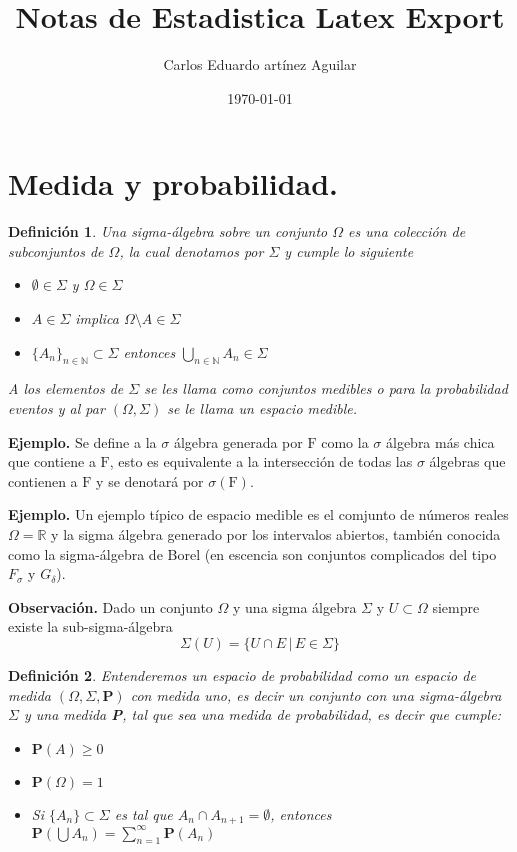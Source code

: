 \documentclass[letterpaper]{article}
\author{Carlos Eduardo artínez Aguilar}
\date{\today}
\title{Notas de Estadistica Latex Export}
\newtheorem{def.}{Definici\'on}[section]
\newcommand{\nat}{\ensuremath{ \mathbb N }}
\newcommand{\eje}{{\newline \noindent \sc \textbf{Ejemplo. }}}
\newcommand{\obs}{{\newline \noindent \sc \textbf{Observación. }}}
\newcommand{\re}{\ensuremath{\mathbb R }}
\begin{document}
\maketitle
\tableofcontents

\section{Medida y probabilidad.}
\label{sec:org2c0d45f}

\begin{def.}
Una \emph{sigma-álgebra} sobre un conjunto \(\Omega\) es una colección de subconjuntos de \(\Omega\), la cual denotamos por \(\Sigma\) y cumple lo siguiente
\begin{itemize}
\item \(\emptyset\in\Sigma\) y \(\Omega\in\Sigma\)
\item \(A\in\Sigma\) implica \(\Omega\setminus A\in\Sigma\)
\item \(\{A_n\}_{n\in\nat}\subset\Sigma\) entonces \(\bigcup_{n\in\nat} A_n\in\Sigma\)
\end{itemize}
A los elementos de \(\Sigma\) se les llama como \emph{conjuntos medibles} o para la probabilidad \emph{eventos} y al par \((\Omega,\Sigma)\) se le llama un espacio medible.
\end{def.}

\eje Se define a la \(\sigma\) álgebra generada por \(\mathrm{F}\) como la \(\sigma\) álgebra más chica que contiene a \(\mathrm{F}\), esto es equivalente a la intersección de todas las \(\sigma\) álgebras que contienen a \(\mathrm{F}\) y se denotará por \(\sigma(\mathrm{F})\).

\eje Un ejemplo típico de espacio medible es el comjunto de números reales \(\Omega=\re\) y la sigma álgebra generado por los intervalos abiertos, también conocida como la sigma-álgebra de Borel (en escencia son conjuntos complicados del tipo \(F_{\sigma}\) y \(G_{\delta}\)).

\obs Dado un conjunto \(\Omega\) y una sigma álgebra \(\Sigma\) y \(U\subset\Omega\) siempre existe la sub-sigma-álgebra
\[
    \Sigma(U)=\{U\cap E\,|\,E\in\Sigma\}
\]

\begin{def.}
\noindent Entenderemos un \emph{espacio de probabilidad} como un espacio de medida \((\Omega,\Sigma,\textbf{P})\) con medida uno, es decir un conjunto con una \emph{sigma-álgebra} \(\Sigma\) y una medida \textbf{P}, tal que sea una medida de probabilidad, es decir que cumple:

\begin{itemize}
\item \(\textbf{P}(A)\geq 0\)
\item \(\textbf{P}(\Omega)=1\)
\item Si \(\{A_n\}\subset\Sigma\) es tal que \(A_n\cap A_{n+1}=\emptyset\), entonces \(\textbf{P}(\bigcup A_n)=\sum_{n=1}^{\infty} \textbf{P}(A_n)\)
\end{itemize}
\end{def.}
\end{document}
